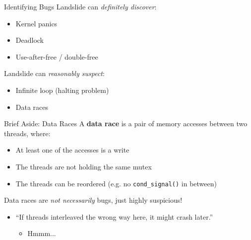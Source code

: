 \documentclass[xcolor=dvipsnames]{beamer}
\begin{document}
\begin{frame}{Identifying Bugs}
	Landslide can {\em definitely discover}:
	\begin{itemize}
		\item Kernel panics %
		\item Deadlock
		\item Use-after-free / double-free
	\end{itemize}
	\linegap
	Landslide can {\em reasonably suspect}:
	\begin{itemize}
		\item Infinite loop (halting problem)
		\item Data races
	\end{itemize}
\end{frame}

\begin{frame}{Brief Aside: Data Races}
	A {\bf data race} is a pair of memory accesses between two threads, where:
	\begin{itemize}
		\item At least one of the accesses is a write
		\item The threads are not holding the same mutex
		\item The threads can be reordered (e.g. no \texttt{cond\_signal()} in between)
	\end{itemize}
	\pause
	\linegap

	Data races are {\em not necessarily} bugs, just highly suspicious!
	\begin{itemize}
		\item ``If threads interleaved the wrong way here, it might crash later.''
		\begin{itemize}
			\item Hmmm...
		\end{itemize}
	\end{itemize}
\end{frame}
\end{document}
